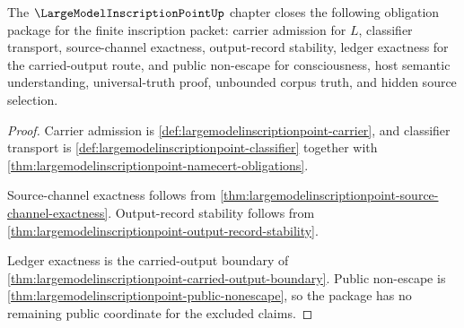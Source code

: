 \begin{theorem}
\label{thm:largemodelinscriptionpoint-obligation-closure-package}
The $\LargeModelInscriptionPointUp$ chapter closes the following obligation package for the finite inscription packet: carrier admission for $L$, classifier transport, source-channel exactness, output-record stability, ledger exactness for the carried-output route, and public non-escape for consciousness, host semantic understanding, universal-truth proof, unbounded corpus truth, and hidden source selection.
\end{theorem}
\begin{proof}
Carrier admission is \autoref{def:largemodelinscriptionpoint-carrier}, and classifier transport is \autoref{def:largemodelinscriptionpoint-classifier} together with \autoref{thm:largemodelinscriptionpoint-namecert-obligations}.

Source-channel exactness follows from \autoref{thm:largemodelinscriptionpoint-source-channel-exactness}. Output-record stability follows from \autoref{thm:largemodelinscriptionpoint-output-record-stability}.

Ledger exactness is the carried-output boundary of \autoref{thm:largemodelinscriptionpoint-carried-output-boundary}. Public non-escape is \autoref{thm:largemodelinscriptionpoint-public-nonescape}, so the package has no remaining public coordinate for the excluded claims.
\end{proof}

